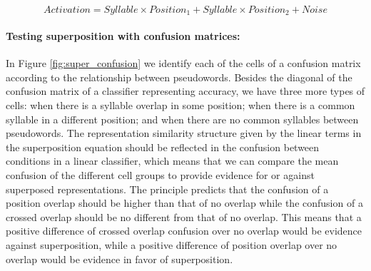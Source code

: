 \begin{equation}
Activation = Syllable \times Position_1 + Syllable \times Position_2 + Noise
\label{equation:superposition}
\end{equation}


\paragraph{Testing superposition with confusion matrices:}
In Figure \ref{fig:super_confusion} we identify each of the cells of a confusion matrix according to the relationship between pseudowords.
Besides the diagonal of the confusion matrix of a classifier representing accuracy, we have three more types of cells: when there is a syllable overlap in some position; when there is a common syllable in a different position; and when there are no common syllables between pseudowords.
The representation similarity structure given by the linear terms in the superposition equation should be reflected in the confusion between conditions in a linear classifier, which means that we can compare the mean confusion of the different cell groups to provide evidence for or against superposed representations.
The principle predicts that the confusion of a position overlap should be higher than that of no overlap while the confusion of a crossed overlap should be no different from that of no overlap.
This means that a positive difference of crossed overlap confusion over no overlap would be evidence against superposition, while a positive difference of position overlap over no overlap would be evidence in favor of superposition.



